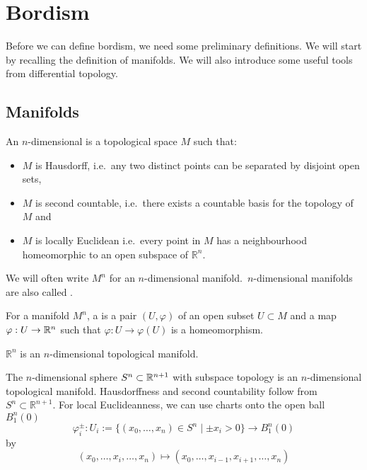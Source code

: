\documentclass[a4paper,11pt]{article}
\begin{document}


\section{Bordism}\label{Kap Bordism}

Before we can define bordism, we need some preliminary definitions. We will start by recalling the definition of manifolds. We will also introduce some useful tools from differential topology.

\subsection{Manifolds}\label{Kap Manifolds}

\begin{definition}
    An \(n\)-dimensional  is a topological space \(M\) such that:
    \begin{itemize}
        \item \(M\) is Hausdorff, i.e.\ any two distinct points can be separated by disjoint open sets,
        \item \(M\) is second countable, i.e.\ there exists a countable basis for the topology of \(M\) and
        \item \(M\) is locally Euclidean i.e.\ every point in \(M\) has a neighbourhood homeomorphic to an open subspace of \(\mathbb{R}^n\).
    \end{itemize}
    We will often write \(M^n\) for an \(n\)-dimensional manifold.\ \(n\)-dimensional manifolds are also called .
\end{definition}

\begin{definition}[Chart]
    For a manifold \(M^n\), a  is a pair \((U,\varphi)\) of an open subset \(U\subset M\) and a map \(\varphi:U\to\mathbb{R}^n\) such that \(\varphi:U\to\varphi(U)\) is a homeomorphism.
\end{definition}

\begin{example}
    \(\mathbb{R}^n\) is an \(n\)-dimensional topological manifold.
\end{example}

\begin{example}\label{sphere chart}
    The \(n\)-dimensional sphere \(S^n\subset\mathbb{R}^{n+1}\) with subspace topology is an \(n\)-dimensional topological manifold. Hausdorffness and second countability follow from \(S^n\subset \mathbb{R}^{n+1}\). For local Euclideanness, we can use charts onto the open ball \(B_1^n(0)\)
     \[\varphi_i^\pm:U_i:=\{(x_0,\dots,x_n)\in S^n\mid \pm x_i>0\}\to B_1^n(0)\] by \[(x_0,\dots,x_i,\dots,x_n)\mapsto(x_0,\dots,x_{i-1},x_{i+1},\dots,x_n)\]
\end{example}
\end{document}

